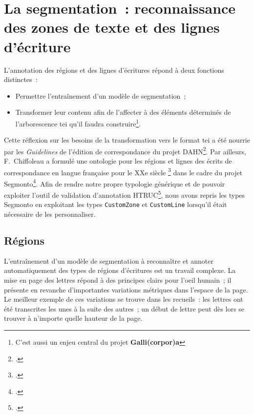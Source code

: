 \documentclass[a4paper,12pt,twoside]{book}
\begin{document}
		\section[La segmentation]{La segmentation~: reconnaissance des zones de texte et des lignes d'écriture}
			\label{lieu-segmentation}
			
			L'annotation des régions et des lignes d'écritures répond à deux fonctions distinctes~:
			
			\begin{itemize}
				\item Permettre l'entraînement d'un modèle de \gls{segmentation}~;
				\item Transformer leur contenu afin de l'affecter à des éléments déterminés de l'arborescence \gls{tei} qu'il faudra construire\footnote{C'est aussi un enjeu central du projet \textbf{Galli(corpor)a}}.
			\end{itemize}

				Cette réflexion sur les besoins de la transformation vers le format \gls{tei} a été nourrie par les \textit{Guidelines} de l'édition de correspondance du projet DAHN\footcite{chiffoleauCorrespondenceGuidelines2022}. Par ailleurs, F.~Chiffoleau a formulé une ontologie pour les régions et lignes des écrits de correspondance en langue française pour le XXe siècle \footcite{chiffoleauCorrespondanceLangueFrancaise2021} dans le cadre du projet \gls{Segmonto}\footcite{gabaySegmOntoCommonVocabulary2021}. Afin de rendre notre propre typologie générique et de pouvoir exploiter l'outil de validation d'annotation HTRUC\footcite{clericeHTRUCHTRUnitedCatalog2021}, nous avons repris les types \gls{Segmonto} en exploitant les types \texttt{CustomZone} et \texttt{CustomLine} lorsqu'il était nécessaire de les personnaliser.

			\subsection{Régions}
				L'entraînement d'un modèle de \gls{segmentation} à reconnaître et annoter automatiquement des types de régions d'écritures est un travail complexe. La mise en page des lettres répond à des principes clairs pour l'oeil humain~; il présente en revanche d'importantes variations métriques dans l'espace de la page. Le meilleur exemple de ces variations se trouve dans les recueils~: les lettres ont été transcrites les unes à la suite des autres~; un début de lettre peut dès lors se trouver à n'importe quelle hauteur de la page. 
				
\end{document}
